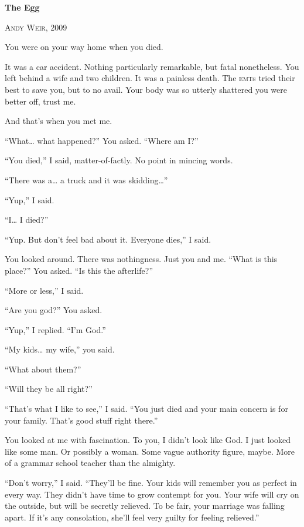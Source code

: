 {\centering
  \Large{}
  \textbf{The Egg}
  
  \normalsize{}
  \textsc{Andy Weir, 2009}
  \par
}

\medskip

You were on your way home when you died.

It was a car accident. Nothing particularly remarkable, but fatal nonetheless. You left behind a wife and two children. It was a painless death. The \textsc{emt}s tried their best to save you, but to no avail. Your body was so utterly shattered you were better off, trust me.

And that's when you met me.

\enquote{What\ldots{} what happened?} You asked. \enquote{Where am I?}

\enquote{You died,} I said, matter-of-factly. No point in mincing words.

\enquote{There was a\ldots{} a truck and it was skidding\ldots{}}

\enquote{Yup,} I said.

\enquote{I\ldots{} I died?}

\enquote{Yup. But don't feel bad about it. Everyone dies,} I said.

You looked around. There was nothingness. Just you and me. \enquote{What is this place?} You asked. \enquote{Is this the afterlife?}

\enquote{More or less,} I said.

\enquote{Are you god?} You asked.

\enquote{Yup,} I replied. \enquote{I'm God.}

\enquote{My kids\ldots{} my wife,} you said.

\enquote{What about them?}

\enquote{Will they be all right?}

\enquote{That's what I like to see,} I said. \enquote{You just died and your main concern is for your family. That's good stuff right there.}

You looked at me with fascination. To you, I didn't look like God. I just looked like some man. Or possibly a woman. Some vague authority figure, maybe. More of a grammar school teacher than the almighty.

\enquote{Don't worry,} I said. \enquote{They'll be fine. Your kids will remember you as perfect in every way. They didn't have time to grow contempt for you. Your wife will cry on the outside, but will be secretly relieved. To be fair, your marriage was falling apart. If it's any consolation, she'll feel very guilty for feeling relieved.}

